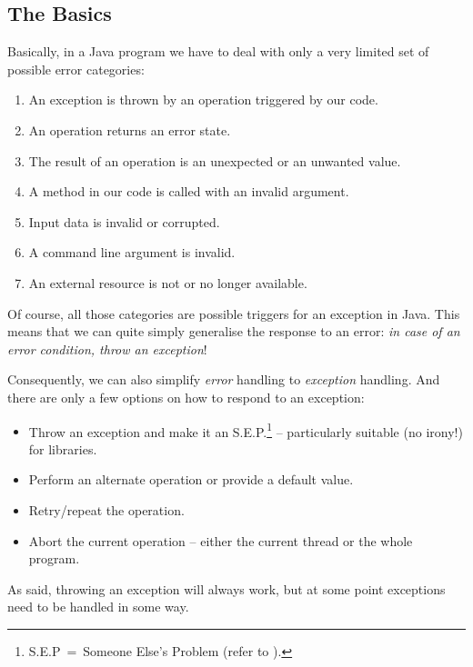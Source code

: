 \documentclass[11pt,a4paper, titlepage, parskip=half, headsepline, footsepline, cleardoublepage=current, headheight=1cm]{scrbook}
\begin{document}

\subsection{The Basics}
Basically, in a Java program we have to deal with only a very limited set of possible error categories:
\begin{enumerate}[nosep]
\item{An exception is thrown by an operation triggered by our code.}
\item{An operation returns an error state.}
\item{The result of an operation is an unexpected or an unwanted value.}
\item{A method in our code is called with an invalid argument.}
\item{Input data is invalid or corrupted.}
\item{A command line argument is invalid.}
\item{An external resource is not or no longer available.}
\end{enumerate}

Of course, all those categories are possible triggers for an exception in Java. This means that we can quite simply generalise the response to an error: \textit{in case of an error condition, throw an exception}!

Consequently, we can also simplify \textit{error} handling to \textit{exception} handling. And there are only a few options on how to respond to an exception:
\begin{itemize}
\item{Throw an exception and make it an S.E.P.\footnote{S.E.P~=~Someone Else's Problem (refer to \autocite{ADAMS_HITCHHIKERS_GUIDE}).} – particularly suitable (no irony!) for libraries.}
\item{Perform an alternate operation or provide a default value.}
\item{Retry/repeat the operation.}
\item{Abort the current operation – either the current thread or the whole program.}
\end{itemize}

As said, throwing an exception will always work, but at some point exceptions need to be handled in some way.
\end{document}
